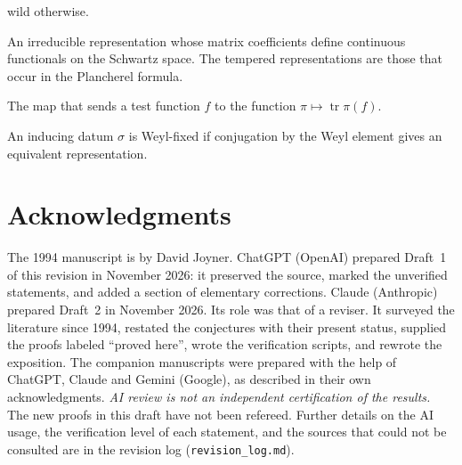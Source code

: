 \documentclass[12pt,letterpaper]{article}
\numberwithin{equation}{section}
\theoremstyle{definition}
\newcommand{\proved}{proved here}
\DeclareMathOperator{\tr}{tr}
\begin{document}
\begin{description}[leftmargin=0.6cm,style=nextline,itemsep=2pt]
wild otherwise.
\item[Tempered representation] An irreducible representation whose matrix coefficients
define continuous functionals on the Schwartz space.  The tempered representations are
those that occur in the Plancherel formula.
\item[Trace transform] The map that sends a test function $f$ to the function
$\pi\mapsto\tr\pi(f)$.
\item[Weyl-fixed] An inducing datum $\sigma$ is Weyl-fixed if conjugation by the Weyl
element gives an equivalent representation.
\end{description}

\section*{Acknowledgments}
The 1994 manuscript is by David Joyner.  ChatGPT (OpenAI) prepared Draft~1 of this
revision in November 2026: it preserved the source, marked the unverified statements,
and added a section of elementary corrections.  Claude (Anthropic) prepared Draft~2 in
November 2026.  Its role was that of a reviser.  It surveyed the literature since 1994,
restated the conjectures with their present status, supplied the proofs labeled
``\proved'', wrote the verification scripts, and rewrote the exposition.  The companion
manuscripts \cite{JoUD,JoSyn,JoCh,JoTr,JoMJL} were prepared with the help of ChatGPT,
Claude and Gemini (Google), as described in their own acknowledgments.
\emph{AI review is not an independent certification of the results.}  The new proofs in
this draft have not been refereed.  Further details on the AI usage, the verification
level of each statement, and the sources that could not be consulted are in the revision
log (\texttt{revision\_log.md}).
\end{document}

